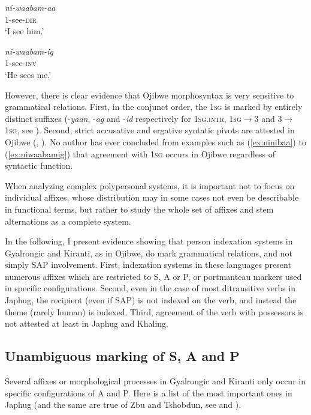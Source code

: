 \documentclass[oldfontcommands,oneside,a4paper,11pt]{article}
\begin{document}
\begin{exe}
\ex  \label{ex:niwaabamaa}
\gll \textit{ni-waabam-aa} \\
1-see-\textsc{dir} \\
\glt `I see him.'
\end{exe} 

\begin{exe}
\ex   \label{ex:niwaabamig}
\gll \textit{ni-waabam-ig} \\
1-see-\textsc{inv} \\
\glt `He sees me.'
\end{exe} 
 
However, there is clear evidence that Ojibwe morphosyntax is very sensitive to grammatical relations. First, in the conjunct order, the \textsc{1sg} is marked by entirely distinct suffixes (-\textit{yaan}, -\textit{ag} and -\textit{id} respectively for \textsc{1sg.intr}, \textsc{1sg}$\rightarrow$3 and  3$\rightarrow$\textsc{1sg}, see \citealt[295]{valentine01grammar}). Second, strict accusative and ergative syntatic pivots are attested in Ojibwe (\citealt{rhodes94valency}, \citealt[119-126]{zuniga06}). No author has ever concluded from examples such as (\ref{ex:ninibaa}) to (\ref{ex:niwaabamig}) that agreement with \textsc{1sg} occurs in Ojibwe  regardless of syntactic function.

When analyzing complex polypersonal systems, it is important not to focus on individual affixes, whose distribution may in some cases not even be describable in functional terms, but rather to study the whole set of affixes and stem alternations as a complete system. 

In the following, I present evidence showing that person indexation systems in Gyalrongic and Kiranti, as in Ojibwe, do mark grammatical relations, and not simply SAP involvement. First, indexation systems in these languages present numerous affixes which are restricted to S, A or P, or portmanteau markers used in specific configurations. Second, even in the case of most ditransitive verbs in Japhug, the recipient (even if SAP) is not indexed on the verb, and instead the theme (rarely human) is indexed. Third, agreement of the verb with possessors is not attested at least in Japhug and Khaling.

\subsection{Unambiguous marking of S, A and P}
Several affixes or morphological processes in Gyalrongic and Kiranti only occur  in specific configurations of A and P. Here is a list of the most important ones in Japhug (and the same are true of Zbu and Tshobdun, see \citealt{jackson00sidaba, jackson02rentongdengdi} and \citealt{gongxun14agreement}).
\end{document}
